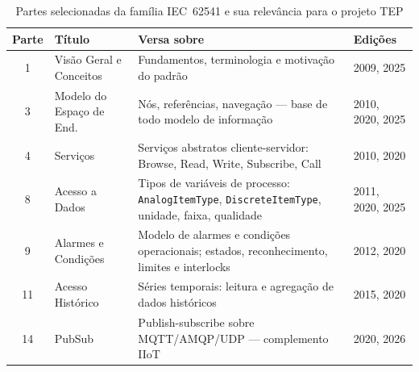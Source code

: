 \begin{table}[ht!]
	\centering
	\caption{Partes selecionadas da família IEC~62541 e sua relevância para o projeto TEP}
	\label{tab:iec62541}
	\begin{tabular}{|c|l|p{5cm}|p{3.2cm}|}
		\hline
		\textbf{Parte} & \textbf{Título}          & \textbf{Versa sobre}                                                                                                            & \textbf{Edições} \\
		\hline
		1              & Visão Geral e Conceitos  & Fundamentos, terminologia e motivação do padrão                                                                                 & 2009, 2025       \\
		\hline
		3              & Modelo do Espaço de End. & Nós, referências, navegação --- base de todo modelo de informação \cite{IEC62541_3}                                             & 2010, 2020, 2025 \\
		\hline
		4              & Serviços                 & Serviços abstratos cliente-servidor: Browse, Read, Write, Subscribe, Call                                                       & 2010, 2020       \\
		\hline
		8              & Acesso a Dados           & Tipos de variáveis de processo: \texttt{AnalogItemType}, \texttt{DiscreteItemType}, unidade, faixa, qualidade \cite{IEC62541_8} & 2011, 2020, 2025 \\
		\hline
		9              & Alarmes e Condições      & Modelo de alarmes e condições operacionais; estados, reconhecimento, limites e interlocks                                       & 2012, 2020       \\
		\hline
		11             & Acesso Histórico         & Séries temporais: leitura e agregação de dados históricos                                                                       & 2015, 2020       \\
		\hline
		14             & PubSub                   & Publish-subscribe sobre MQTT/AMQP/UDP --- complemento IIoT                                                                      & 2020, 2026       \\
		\hline
	\end{tabular}
\end{table}

